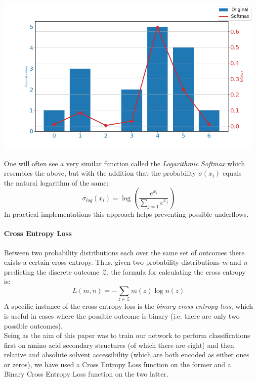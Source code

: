 \begin{multicols}{2}
\begin{Figure}
 \centering
 \includegraphics[width=\linewidth]{../graphs/softmax}
 \captionsetup{width=0.8\linewidth, font=small}
\end{Figure}
One will often see a very similar function called the \textit{Logarithmic Softmax} which resembles the above, but with the addition that the probability $\sigma(x_i)$ equals the natural logarithm of the same:
\[
\sigma_{log}\left(x_{i}\right)=\log \left(\frac{e^{ x_{i}}}{\sum_{j=1} e^{ x_{j}}}\right)
\]
In practical implementations this approach helps preventing possible underflows.



\paragraph{Cross Entropy Loss}
Between two probability distributions each over the same set of outcomes there exists a certain cross entropy.
Thus, given two probability distributions \textit{m} and \textit{n} predicting the discrete outcome $\mathcal{Z}$, the formula for calculating the cross entropy is:
$$L ( m , n ) = - \sum _ { z \in \mathcal { Z } } m ( z ) \log n ( z )$$
A specific instance of the cross entropy loss is the \textit{binary cross entropy loss}, which is useful in cases where the possible outcome is binary (i.e. there are only two possible outcomes). 
\\
Seing as the aim of this paper was to train our network to perform classifications first on amino acid secondary structures (of which there are eight) and then relative and absolute solvent accessibility (which are both encoded as either ones or zeros), we have used a Cross Entropy Loss function on the former and a Binary Cross Entropy Loss function on the two latter.



\end{multicols}
